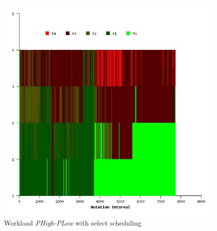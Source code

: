 \begin{figure}
  \begin{center}
    \includegraphics[scale=0.4]{figures/mutation_timeline_figures/mut_sel_t0/PHigh-PLow/125_4.jpeg}%
    \caption{Workload \textit{PHigh-PLow} with select scheduling}
    \label{fig:wrk_phighplow_select}
  \end{center}
\end{figure}

